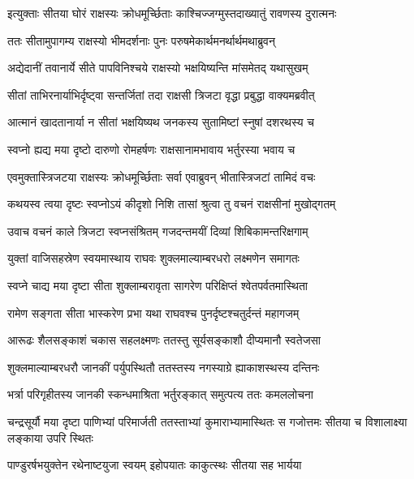 
\twolineshloka
{इत्युक्ताः सीतया घोरं राक्षस्यः क्रोधमूर्च्छिताः}
{काश्चिज्जग्मुस्तदाख्यातुं रावणस्य दुरात्मनः} %

\twolineshloka
{ततः सीतामुपागम्य राक्षस्यो भीमदर्शनाः}
{पुनः परुषमेकार्थमनर्थार्थमथाब्रुवन्} %

\twolineshloka
{अद्येदानीं तवानार्ये सीते पापविनिश्चये}
{राक्षस्यो भक्षयिष्यन्ति मांसमेतद् यथासुखम्} %

\twolineshloka
{सीतां ताभिरनार्याभिर्दृष्ट्वा सन्तर्जितां तदा}
{राक्षसी त्रिजटा वृद्धा प्रबुद्धा वाक्यमब्रवीत्} %

\twolineshloka
{आत्मानं खादतानार्या न सीतां भक्षयिष्यथ}
{जनकस्य सुतामिष्टां स्नुषां दशरथस्य च} %

\twolineshloka
{स्वप्नो ह्यद्य मया दृष्टो दारुणो रोमहर्षणः}
{राक्षसानामभावाय भर्तुरस्या भवाय च} %

\twolineshloka
{एवमुक्तास्त्रिजटया राक्षस्यः क्रोधमूर्च्छिताः}
{सर्वा एवाब्रुवन् भीतास्त्रिजटां तामिदं वचः} %

\twolineshloka
{कथयस्व त्वया दृष्टः स्वप्नोऽयं कीदृशो निशि}
{तासां श्रुत्वा तु वचनं राक्षसीनां मुखोद्गतम्} %

\twolineshloka
{उवाच वचनं काले त्रिजटा स्वप्नसंश्रितम्}
{गजदन्तमयीं दिव्यां शिबिकामन्तरिक्षगाम्} %

\twolineshloka
{युक्तां वाजिसहस्रेण स्वयमास्थाय राघवः}
{शुक्लमाल्याम्बरधरो लक्ष्मणेन समागतः} %

\twolineshloka
{स्वप्ने चाद्य मया दृष्टा सीता शुक्लाम्बरावृता}
{सागरेण परिक्षिप्तं श्वेतपर्वतमास्थिता} %

\twolineshloka
{रामेण सङ्गता सीता भास्करेण प्रभा यथा}
{राघवश्च पुनर्दृष्टश्चतुर्दन्तं महागजम्} %

\twolineshloka
{आरूढः शैलसङ्काशं चकास सहलक्ष्मणः}
{ततस्तु सूर्यसङ्काशौ दीप्यमानौ स्वतेजसा} %

\twolineshloka
{शुक्लमाल्याम्बरधरौ जानकीं पर्युपस्थितौ}
{ततस्तस्य नगस्याग्रे ह्याकाशस्थस्य दन्तिनः} %

\twolineshloka
{भर्त्रा परिगृहीतस्य जानकी स्कन्धमाश्रिता}
{भर्तुरङ्कात् समुत्पत्य ततः कमललोचना} %

\threelineshloka
{चन्द्रसूर्यौ मया दृष्टा पाणिभ्यां परिमार्जती}
{ततस्ताभ्यां कुमाराभ्यामास्थितः स गजोत्तमः}
{सीतया च विशालाक्ष्या लङ्काया उपरि स्थितः} %

\twolineshloka
{पाण्डुरर्षभयुक्तेन रथेनाष्टयुजा स्वयम्}
{इहोपयातः काकुत्स्थः सीतया सह भार्यया} %

